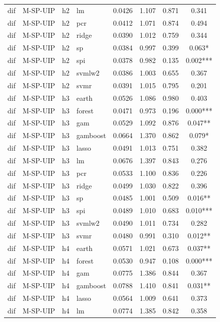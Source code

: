\begin{ThreePartTable}
\begin{longtable}[t]{llclcccc}
dif & M-SP-UIP & h2 & lm & 0.0426 & 1.107 & 0.871 & 0.341\\
dif & M-SP-UIP & h2 & pcr & 0.0412 & 1.071 & 0.874 & 0.494\\
dif & M-SP-UIP & h2 & ridge & 0.0390 & 1.012 & 0.759 & 0.344\\
dif & M-SP-UIP & h2 & sp & 0.0384 & 0.997 & 0.399 & 0.063*\\
dif & M-SP-UIP & h2 & spi & 0.0378 & 0.982 & 0.135 & 0.002***\\
dif & M-SP-UIP & h2 & svmlw2 & 0.0386 & 1.003 & 0.655 & 0.367\\
dif & M-SP-UIP & h2 & svmr & 0.0391 & 1.015 & 0.795 & 0.201\\
\addlinespace
dif & M-SP-UIP & h3 & earth & 0.0526 & 1.086 & 0.980 & 0.403\\
dif & M-SP-UIP & h3 & forest & 0.0471 & 0.973 & 0.196 & 0.000***\\
dif & M-SP-UIP & h3 & gam & 0.0529 & 1.092 & 0.876 & 0.047**\\
dif & M-SP-UIP & h3 & gamboost & 0.0664 & 1.370 & 0.862 & 0.079*\\
dif & M-SP-UIP & h3 & lasso & 0.0491 & 1.013 & 0.751 & 0.382\\
dif & M-SP-UIP & h3 & lm & 0.0676 & 1.397 & 0.843 & 0.276\\
dif & M-SP-UIP & h3 & pcr & 0.0533 & 1.100 & 0.836 & 0.226\\
dif & M-SP-UIP & h3 & ridge & 0.0499 & 1.030 & 0.822 & 0.396\\
dif & M-SP-UIP & h3 & sp & 0.0485 & 1.001 & 0.509 & 0.016**\\
dif & M-SP-UIP & h3 & spi & 0.0489 & 1.010 & 0.683 & 0.010***\\
dif & M-SP-UIP & h3 & svmlw2 & 0.0490 & 1.011 & 0.734 & 0.282\\
dif & M-SP-UIP & h3 & svmr & 0.0480 & 0.991 & 0.310 & 0.012**\\
\addlinespace
dif & M-SP-UIP & h4 & earth & 0.0571 & 1.021 & 0.673 & 0.037**\\
dif & M-SP-UIP & h4 & forest & 0.0530 & 0.947 & 0.108 & 0.000***\\
dif & M-SP-UIP & h4 & gam & 0.0775 & 1.386 & 0.844 & 0.367\\
dif & M-SP-UIP & h4 & gamboost & 0.0788 & 1.410 & 0.841 & 0.031**\\
dif & M-SP-UIP & h4 & lasso & 0.0564 & 1.009 & 0.641 & 0.373\\
dif & M-SP-UIP & h4 & lm & 0.0774 & 1.385 & 0.842 & 0.358\\

\end{longtable}
\end{ThreePartTable}
